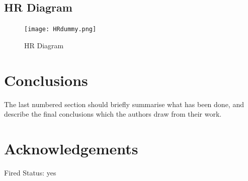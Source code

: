\documentclass[a4paper,fleqn,usenatbib]{mnras}
\begin{document}
\subsection{HR Diagram}
\begin{figure}
	\texttt{[image: HRdummy.png]}
    \caption{HR Diagram}
    \label{fig:figure2}
\end{figure}


\section{Conclusions} \label{sec:con}

The last numbered section should briefly summarise what has been done, and describe
the final conclusions which the authors draw from their work.

\section*{Acknowledgements}

Fired Status: yes
\end{document}
